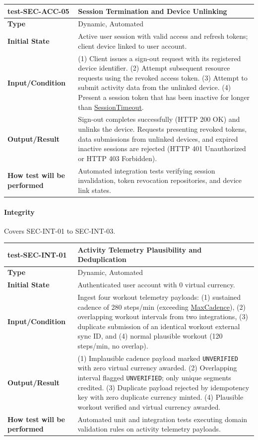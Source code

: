 \documentclass[12pt, titlepage]{article}
\newcommand{\const}[1]{\hyperlink{const:#1}{\textsf{#1}}}
\begin{document}
\noindent\begin{tabularx}{\textwidth}{>{\raggedright\arraybackslash}p{3.5cm}X}
  \toprule
  \textbf{test-SEC-ACC-05} & \textbf{Session Termination and Device Unlinking}\\
  \midrule
  \textbf{Type} & Dynamic, Automated\\
  \textbf{Initial State} & Active user session with valid access and refresh tokens; client device linked to user account.\\
  \textbf{Input/Condition} & (1) Client issues a sign-out request with its registered device identifier. (2) Attempt subsequent resource requests using the revoked access token. (3) Attempt to submit activity data from the unlinked device. (4) Present a session token that has been inactive for longer than \const{SessionTimeout}.\\
  \textbf{Output/Result} & Sign-out completes successfully (HTTP 200 OK) and unlinks the device. Requests presenting revoked tokens, data submissions from unlinked devices, and expired inactive sessions are rejected (HTTP 401 Unauthorized or HTTP 403 Forbidden).\\
  \textbf{How test will be performed} & Automated integration tests verifying session invalidation, token revocation repositories, and device link states.\\
  \bottomrule
\end{tabularx}

\paragraph{Integrity}

Covers SEC-INT-01 to SEC-INT-03.

\noindent\begin{tabularx}{\textwidth}{>{\raggedright\arraybackslash}p{3.5cm}X}
  \toprule
  \textbf{test-SEC-INT-01} & \textbf{Activity Telemetry Plausibility and Deduplication}\\
  \midrule
  \textbf{Type} & Dynamic, Automated\\
  \textbf{Initial State} & Authenticated user account with 0 virtual currency.\\
  \textbf{Input/Condition} & Ingest four workout telemetry payloads: (1) sustained cadence of 280 steps/min (exceeding \const{MaxCadence}), (2) overlapping workout intervals from two integrations, (3) duplicate submission of an identical workout external sync ID, and (4) normal plausible workout (120 steps/min, no overlap).\\
  \textbf{Output/Result} & (1) Implausible cadence payload marked \texttt{UNVERIFIED} with zero virtual currency awarded. (2) Overlapping interval flagged \texttt{UNVERIFIED}; only unique segments credited. (3) Duplicate payload rejected by idempotency key with zero duplicate currency minted. (4) Plausible workout verified and virtual currency awarded.\\
  \textbf{How test will be performed} & Automated unit and integration tests executing domain validation rules on activity telemetry payloads.\\
  \bottomrule
\end{tabularx}
\end{document}
